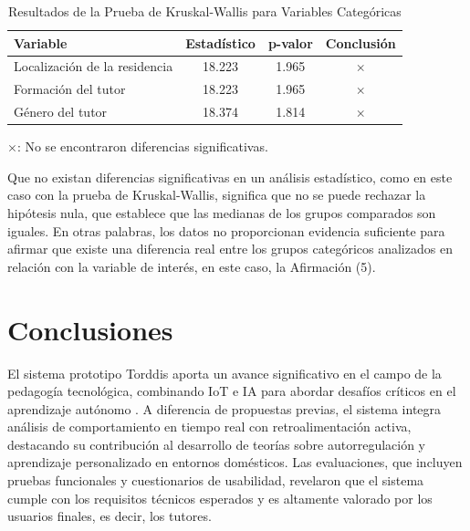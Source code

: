 \documentclass[a4paper,fleqn]{cas-sc}
\begin{document}
					\begin{table}[h!]
						\centering
						\caption{Resultados de la Prueba de Kruskal-Wallis para Variables Categóricas}
						\begin{tabularx}{0.75\textwidth}{Xccc}
							\toprule
							\textbf{Variable} & \textbf{Estadístico} &  \textbf{p-valor} & \textbf{Conclusión} \\
							\midrule
							Localización de la residencia & 18.223 & 1.965 & \(\times\) \\ %
							Formación del tutor & 18.223 & 1.965 & \(\times\) \\ %
							Género del tutor & 18.374 & 1.814 &  \(\times\) \\ %
							\bottomrule
						\end{tabularx}
						\label{table:Kruskal-Wallis}
						\vspace{0.3em} %
						\parbox{0.75\textwidth}{\footnotesize 
							\(\times\): No se encontraron diferencias significativas.
						}
					\end{table}
					
					Que no existan diferencias significativas en un análisis estadístico, como en este caso con la prueba de Kruskal-Wallis, significa que no se puede rechazar la hipótesis nula, que establece que las medianas de los grupos comparados son iguales. En otras palabras, los datos no proporcionan evidencia suficiente para afirmar que existe una diferencia real entre los grupos categóricos analizados en relación con la variable de interés, en este caso, la Afirmación (5).
						
	\section{Conclusiones}
	\label{seccion:Seis}
		El sistema prototipo Torddis aporta un avance significativo en el campo de la pedagogía tecnológica, combinando IoT e IA para abordar desafíos críticos en el aprendizaje autónomo \citep{DiPietro2025Meta}. A diferencia de propuestas previas, el sistema integra análisis de comportamiento en tiempo real con retroalimentación activa, destacando su contribución al desarrollo de teorías sobre autorregulación y aprendizaje personalizado en entornos domésticos. Las evaluaciones, que incluyen pruebas funcionales y cuestionarios de usabilidad, revelaron que el sistema cumple con los requisitos técnicos esperados y es altamente valorado por los usuarios finales, es decir, los tutores.
		
\end{document}
